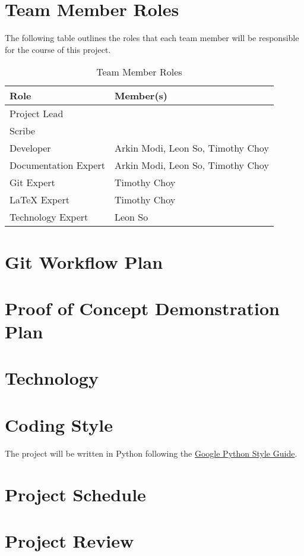 \documentclass{article}
\begin{document}
\section{Team Member Roles}
The following table outlines the roles that each team member will be responsible for the course of this project.

\begin{table}
    \centering
    \begin{tabular}{|l|l|}
        \hline
        \textbf{Role} & \textbf{Member(s)} \\
        \hline
        Project Lead & \\
        \hline
        Scribe & \\
        \hline
        Developer & Arkin Modi, Leon So, Timothy Choy \\
        \hline
        Documentation Expert & Arkin Modi, Leon So, Timothy Choy \\
        \hline
        Git Expert & Timothy Choy \\
        \hline
        LaTeX Expert & Timothy Choy \\
        \hline
        Technology Expert & Leon So \\
        \hline
    \end{tabular}
    \caption{Team Member Roles}
\end{table}


\section{Git Workflow Plan}

\section{Proof of Concept Demonstration Plan}

\section{Technology}

\section{Coding Style}
The project will be written in Python following the \href{https://google.github.io/styleguide/pyguide.html}{Google Python Style Guide}.

\section{Project Schedule}

\section{Project Review}
\end{document}
